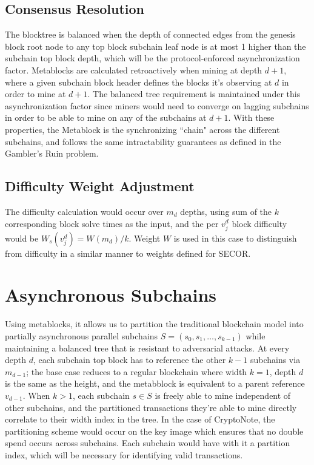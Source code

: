 \documentclass{article}
\begin{document}
\subsection{Consensus Resolution}
The blocktree is balanced when the depth of connected edges from the genesis block root node to any top block subchain leaf node is at most 1 higher than the subchain top block depth, which will be the protocol-enforced asynchronization factor. Metablocks are calculated retroactively when mining at depth $d+1$, where a given subchain block header defines the blocks it's observing at $d$ in order to mine at $d+1$. The balanced tree requirement is maintained under this asynchronization factor since miners would need to converge on lagging subchains in order to be able to mine on any of the subchains at $d+1$. With these properties, the Metablock is the synchronizing ``chain" across the different subchains, and follows the same intractability guarantees as defined in the Gambler's Ruin problem\cite{nakamoto}.
\subsection{Difficulty Weight Adjustment}
The difficulty calculation would occur over $m_d$ depths, using sum of the $k$ corresponding block solve times as the input, and the per $v_j^d$ block difficulty would be $W_s(v_j^d) = W(m_d) / k$. Weight $W$ is used in this case to distinguish from difficulty in a similar manner to weights defined for SECOR\cite{khawaja}.
\section{Asynchronous Subchains}
Using metablocks, it allows us to partition the traditional blockchain model into partially asynchronous parallel subchains $S = (s_0, s_1, \ldots, s_{k-1})$ while maintaining a balanced tree that is resistant to adversarial attacks. At every depth $d$, each subchain top block has to reference the other $k-1$ subchains via $m_{d-1}$; the base case reduces to a regular blockchain where width $k = 1$, depth $d$ is the same as the height, and the metabblock is equivalent to a parent reference $v_{d-1}$. When $k > 1$, each subchain $s \in S$ is freely able to mine independent of other subchains, and the partitioned transactions they're able to mine directly correlate to their width index in the tree. In the case of CryptoNote\cite{saberhagen}, the partitioning scheme would occur on the key image which ensures that no double spend occurs across subchains. Each subchain would have with it a partition index, which will be necessary for identifying valid transactions.
\end{document}
